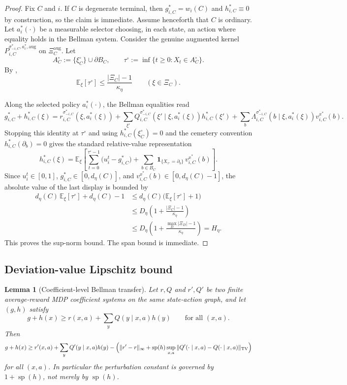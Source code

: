 \documentclass[12pt]{article}
\newtheorem{lemma}[theorem]{Lemma}
\theoremstyle{definition}
\newcommand{\E}{\mathbb{E}}
\newcommand{\1}{\mathbf{1}}
\DeclareMathOperator{\spn}{sp}
\begin{document}
\begin{proof}
Fix $C$ and $i$. If $C$ is degenerate terminal, then
$g_{i,C}^*=w_i(C)$ and $h_{i,C}^*\equiv 0$ by construction, so the claim is
immediate. Assume henceforth that $C$ is ordinary. Let $a_i^*(\cdot)$ be a
measurable selector choosing, in each state, an action where equality holds in
the Bellman system. Consider the genuine augmented kernel
$P_{i,C}^{\sigma_{-i,C}^*,a_i^*,\mathrm{aug}}$ on
$\Xi_C^{\mathrm{aug}}$. Let
\[
A_C^\circ:=\{\xi_C^\circ\}\cup\partial B_C,
\qquad
\tau^\circ:=\inf\{t\ge 0:X_t\in A_C^\circ\}.
\]
By ,
\[
\E_\xi[\tau^\circ]\le \frac{|\Xi_C|-1}{\kappa_\eta}
\qquad (\xi\in\Xi_C).
\]

Along the selected policy $a_i^*(\cdot)$, the Bellman equalities read
\[
g_{i,C}^*+h_{i,C}^*(\xi)
=
r_{i,C}^{\sigma_{-i,C}^*}(\xi,a_i^*(\xi))
+
\sum_{\xi'}Q_{i,C}^{\sigma_{-i,C}^*}(\xi'\mid\xi,a_i^*(\xi))h_{i,C}^*(\xi')
+
\sum_b\Lambda_{i,C}^{\sigma_{-i,C}^*}(b\mid\xi,a_i^*(\xi))v_{i,C}^{x^*}(b).
\]
Stopping this identity at $\tau^\circ$ and using $h_{i,C}^*(\xi_C^\circ)=0$ and
the cemetery convention $h_{i,C}^*(\partial_b)=0$ gives the standard relative-value
representation
\[
h_{i,C}^*(\xi)
=
\E_\xi\!\left[
\sum_{t=0}^{\tau^\circ-1}\bigl(u_i^t-g_{i,C}^*\bigr)
+
\sum_{b\in B_C}\1_{\{X_{\tau^\circ}=\partial_b\}}\,v_{i,C}^{x^*}(b)
\right].
\]
Since $u_i^t\in[0,1]$, $g_{i,C}^*\in[0,d_\eta(C)]$, and
$v_{i,C}^{x^*}(b)\in[0,d_\eta(C)-1]$, the absolute value of the last display is
bounded by
\[
\begin{aligned}
d_\eta(C)\,\E_\xi[\tau^\circ] + d_\eta(C)-1
&\le
d_\eta(C)\bigl(\E_\xi[\tau^\circ]+1\bigr)
\\
&\le
D_\eta\left(1+\frac{|\Xi_C|-1}{\kappa_\eta}\right)
\\
&\le
D_\eta\left(1+\frac{\max_D|\Xi_D|-1}{\kappa_\eta}\right)
=
H_\eta.
\end{aligned}
\]
This proves the sup-norm bound. The span bound is immediate.
\end{proof}

\subsection{Deviation-value Lipschitz bound}

\begin{lemma}[Coefficient-level Bellman transfer]
\label{lem:coefficient-transfer}
Let $r,Q$ and $r',Q'$ be two finite average-reward MDP coefficient systems on the
same state-action graph, and let $(g,h)$ satisfy
\[
g+h(x)\ge r(x,a)+\sum_y Q(y\mid x,a)h(y)
\qquad\text{for all }(x,a).
\]
Then
\[
g+h(x)
\ge
r'(x,a)+\sum_y Q'(y\mid x,a)h(y)
-\Bigl(\|r'-r\|_\infty + \spn(h)\sup_{x,a}\|Q'(\cdot\mid x,a)-Q(\cdot\mid x,a)\|_{\mathrm{TV}}\Bigr)
\]
for all $(x,a)$. In particular the perturbation constant is governed by
$1+\spn(h)$, not merely by $\spn(h)$.
\end{lemma}
\end{document}
